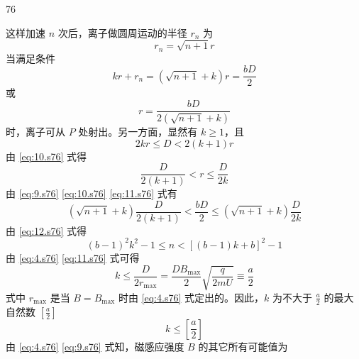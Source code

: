 \begin{solution}{76}
\begin{subsolution}
\begin{equation}
            \label{eq:7.s76}
        \end{equation}
        这样加速 $n$ 次后，离子做圆周运动的半径 $r_{n}$ 为
        \begin{equation}
            r_{n} = \sqrt{n + 1} r
            \label{eq:8.s76}
        \end{equation}
        当满足条件
        \begin{equation}
            k r + r_{n} = (\sqrt{n + 1} + k) r = \frac{b D}{2}
            \label{eq:9.s76}
        \end{equation}
        或
        \begin{equation}
            r = \frac{b D}{2(\sqrt{n + 1} + k)}
        \end{equation}
        时，离子可从 $P$ 处射出。另一方面，显然有 $k \geq 1$，且
        \begin{equation}
            2 k r \leq D < 2 (k + 1) r
            \label{eq:10.s76}
        \end{equation}
        由 \eqref{eq:10.s76} 式得
        \begin{equation}
            \frac{D}{2 (k + 1)} < r \leq \frac{D}{2 k}
            \label{eq:11.s76}
        \end{equation}
        由 \eqref{eq:9.s76} \eqref{eq:10.s76} \eqref{eq:11.s76} 式有
        \begin{equation}
            (\sqrt{n + 1} + k) \frac{D}{2 (k + 1)} < \frac{b D}{2} \leq (\sqrt{n + 1} + k) \frac{D}{2 k}
            \label{eq:12.s76}
        \end{equation}
        由 \eqref{eq:12.s76} 式得
        \begin{equation}
            (b - 1)^{2} k^{2} - 1 \leq n < [ (b - 1) k + b ]^{2} - 1
            \label{eq:13.s76}
        \end{equation}
        由 \eqref{eq:4.s76} \eqref{eq:11.s76} 式可得
        \begin{equation}
            k \leq \frac{D}{2 r_{\max}} = \frac{D B_{\max}}{2} \sqrt{\frac{q}{2 m U}} \equiv \frac{a}{2}
            \label{eq:14.s76}
        \end{equation}
        式中 $r_{\max}$ 是当 $B = B_{\max}$ 时由 \eqref{eq:4.s76} 式定出的。因此，$k$ 为不大于 $\frac{a}{2}$ 的最大自然数 $[\frac{a}{2}]$
        \begin{equation}
            k \leq \left[ \frac{a}{2} \right]
            \label{eq:15.s76}
        \end{equation}
        由 \eqref{eq:4.s76} \eqref{eq:9.s76} 式知，磁感应强度 $B$ 的其它所有可能值为

\end{subsolution}
\end{solution}
